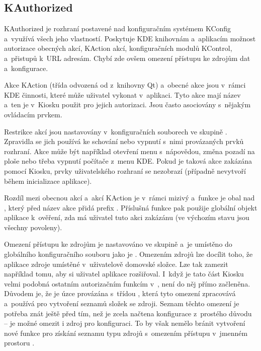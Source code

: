 \subsection*{KAuthorized}
KAuthorized je rozhraní postavené nad konfiguračním systémem KConfig a~využívá všech jeho vlastností. Poskytuje KDE knihovnám a~aplikacím možnost autorizace obecných akcí, KAction akcí, konfiguračních modulů KControl, a~přistupů k~URL adresám. Chybí zde ovšem omezení přístupu ke zdrojům dat a~konfigurace.

Akce KAction (třída  odvozená od  z~knihovny Qt) a~obecné akce jsou v~rámci KDE činnosti, které může uživatel vykonat v~aplikaci. Tyto akce mají název a~ten je v~Kiosku použit pro jejich autorizaci. Jsou často asociovány s~nějakým ovládacím prvkem.

Restrikce akcí jsou nastavovány v~konfiguračních souborech ve skupině \linebreak{}. Zpravidla se jich používá ke schování nebo vypnutí s~nimi provázaných prvků rozhraní. Akce může být například otevření menu s~nápovědou, změna pozadí na ploše nebo třeba vypnutí počítače z~menu KDE. Pokud je taková akce zakázána pomocí Kiosku, prvky uživatelského rozhraní se nezobrazí (případně nevytvoří během inicializace aplikace).

Rozdíl mezi obecnou akcí a~akcí KAction je v~rámci  mizivý a~funkce \linebreak{} je obal nad , který před název akce přidá prefix . Příslušná funkce pak použije globální  objekt aplikace k~ověření, zda má uživatel tuto akci zakázánu (ve výchozím stavu jsou všechny povoleny).

Omezení přístupu ke zdrojům je nastavováno ve skupině  a~je umístěno do globálního konfiguračního souboru jako je . Omezením zdrojů lze docílit toho, že aplikace  zdroje umístěné v~uživatelově domovské složce. Lze tak zamezit například tomu, aby si uživatel aplikace rozšiřoval. I~když je tato část Kiosku velmi podobná ostatním autorizačním funkcím v~, není do něj přímo začleněna. Důvodem je, že je úzce provázána s~třídou , která tyto omezení zpracovává a~používá pro vytvoření seznamů složek se zdroji. Seznam těchto omezení je potřeba znát ještě před tím, než je zcela načtena konfigurace z~prostého důvodu -- je možné omezit i zdroj pro konfiguraci. To by však nemělo bránit vytvoření nové funkce pro získání seznamu typu zdrojů s~omezením přístupu v~jmenném prostoru .

